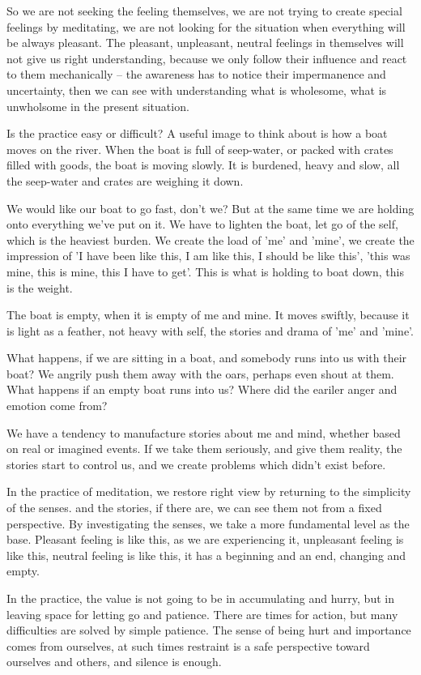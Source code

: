 So we are not seeking the feeling themselves, we are not trying to
create special feelings by meditating, we are not looking for the
situation when everything will be always pleasant. The pleasant,
unpleasant, neutral feelings in themselves will not give us right
understanding, because we only follow their influence and react to them
mechanically -- the awareness has to notice their impermanence and
uncertainty, then we can see with understanding what is wholesome, what
is unwholsome in the present situation.

Is the practice easy or difficult? A useful image to think about is how
a boat moves on the river. When the boat is full of seep-water, or
packed with crates filled with goods, the boat is moving slowly. It is
burdened, heavy and slow, all the seep-water and crates are weighing it
down.

We would like our boat to go fast, don't we? But at the same time we are
holding onto everything we've put on it. We have to lighten the boat,
let go of the self, which is the heaviest burden. We create the load of
'me' and 'mine', we create the impression of 'I have been like this, I
am like this, I should be like this', 'this was mine, this is mine, this
I have to get'. This is what is holding to boat down, this is the
weight.

The boat is empty, when it is empty of me and mine. It moves swiftly,
because it is light as a feather, not heavy with self, the stories and
drama of 'me' and 'mine'.

What happens, if we are sitting in a boat, and somebody runs into us
with their boat? We angrily push them away with the oars, perhaps even
shout at them. What happens if an empty boat runs into us? Where did the
eariler anger and emotion come from?

We have a tendency to manufacture stories about me and mind, whether
based on real or imagined events. If we take them seriously, and give
them reality, the stories start to control us, and we create problems
which didn't exist before.

In the practice of meditation, we restore right view by returning to the
simplicity of the senses. and the stories, if there are, we can see them
not from a fixed perspective. By investigating the senses, we take a
more fundamental level as the base. Pleasant feeling is like this, as we
are experiencing it, unpleasant feeling is like this, neutral feeling is
like this, it has a beginning and an end, changing and empty.

In the practice, the value is not going to be in accumulating and hurry,
but in leaving space for letting go and patience. There are times for
action, but many difficulties are solved by simple patience. The sense
of being hurt and importance comes from ourselves, at such times
restraint is a safe perspective toward ourselves and others, and silence
is enough.
